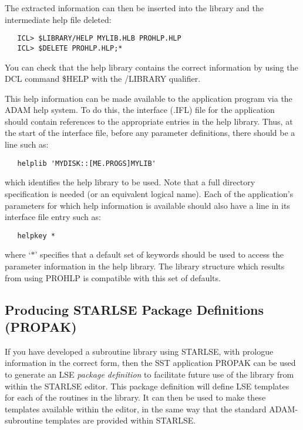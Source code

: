 The extracted information can then be inserted into the library and the
intermediate help file deleted: 

\begin{verbatim}
   ICL> $LIBRARY/HELP MYLIB.HLB PROHLP.HLP
   ICL> $DELETE PROHLP.HLP;*
\end{verbatim}

You can check that the help library contains the correct information by using
the DCL command \$HELP with the /LIBRARY qualifier.

This help information can be made available to the application program via
the ADAM help system. 
To do this, the interface (.IFL) file for the application should contain
references to the appropriate entries in the help library. 
Thus, at the start of the interface file, before any parameter definitions,
there should be a line such as: 

\begin{verbatim}
   helplib 'MYDISK::[ME.PROGS]MYLIB'
\end{verbatim}

which identifies the help library to be used.
Note that a full directory specification is needed (or an equivalent logical
name). 
Each of the application's parameters for which help information is available
should also have a line in its interface file entry such as: 

\begin{verbatim}
   helpkey *
\end{verbatim}

where `$*$' specifies that a default set of keywords should be used to
access the parameter information in the help library. 
The library structure which results from using PROHLP is compatible with 
this set of defaults.


\subsection{Producing STARLSE Package Definitions (PROPAK)}
\label{sect:propak}

If you have developed a subroutine library using STARLSE, with prologue
information in the correct form, then the SST application PROPAK can be used
to generate an LSE {\em package definition} to facilitate future use of the
library from within the STARLSE editor. 
This package definition will define LSE templates for each of the routines
in the library.
It can then be used to make these templates available within the editor, in
the same way that the standard ADAM-subroutine templates are provided within
STARLSE. 

